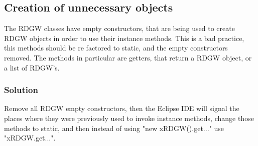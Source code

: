\documentclass[12pt]{article}
\begin{document}
\subsection{Creation of unnecessary objects}
The RDGW classes have empty constructors, that are being used to create RDGW objects in order to use their instance methods. This is a bad practice, this methods should be re factored to static, and the empty constructors removed. The methods in particular are getters, that return a RDGW object, or a list of RDGW's. 


\subsubsection{Solution}
Remove all RDGW empty constructors, then the Eclipse IDE will signal the places where they were previously used to invoke instance methods, change those methods to static, and then instead of using "new xRDGW().get..." use "xRDGW.get...".





\end{document}
